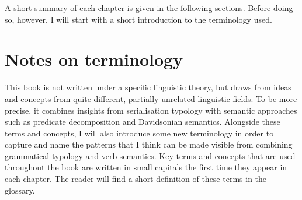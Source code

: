A short summary of each chapter is given in the following sections. Before doing so, however, I will start with a short introduction to the terminology used.

\section*{Notes on terminology}

This book is not written under a specific linguistic theory, but draws from ideas and concepts from quite different, partially unrelated linguistic fields. To be more precise, it combines insights from serialisation typology with semantic approaches such as predicate decomposition and Davidsonian semantics. Alongside these terms and concepts, I will also introduce some new terminology in order to capture and name the patterns that I think can be made visible from combining grammatical typology and verb semantics. Key terms and concepts that are used throughout the book are written in small capitals the first time they appear in each chapter. The reader will find a short definition of these terms in the glossary.

